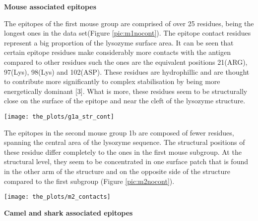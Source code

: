 \documentclass{article}
\begin{document}
\textbf{Mouse associated epitopes}


The epitopes of the first mouse group are comprised of over 25 residues, being the longest ones in the data set(Figure \ref{pic:m1nocont}). The epitope contact residues represent a big proportion of the lysozyme surface area. It can be seen that certain epitope residues make considerably more contacts with the antigen compared to other residues such the ones are the equivalent positions 21(ARG), 97(Lys), 98(Lys) and 102(ASP). These residues are hydrophillic and are thought to contribute more significantly to complex stabilisation by being more energetically dominant [3]. What is more, these residues seem to be structurally close  on the surface of the epitope and near the cleft of the lysozyme structure.
\begin{center}
	\texttt{[image: the\_plots/g1a\_str\_cont]}
	 \label{pic:m1nocont} %
\end{center}

The epitopes in the second mouse group 1b are composed of fewer residues, spanning the central area of the lysozyme sequence. The structural positions of these residue differ completely to the ones in the first mouse subgroup. At the structural level, they seem to be concentrated in one surface patch that is found in the other arm of the structure and on the opposite side of the structure compared to the first subgroup (Figure \ref{pic:m2nocont}).
\begin{center}
	\texttt{[image: the\_plots/m2\_contacts]}
	 \label{pic:m2nocont} %
\end{center}


\textbf{Camel and shark associated epitopes}
\end{document}
